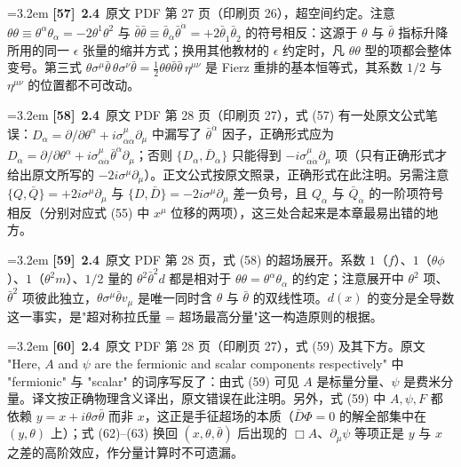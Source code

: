 \par
\par\medskip\noindent\hangindent=3.2em \textbf{[57]}~\textbf{2.4}~原文 PDF 第 27 页（印刷页 26），超空间约定。注意 $\theta\theta\equiv\theta^\alpha\theta_\alpha=-2\theta^1\theta^2$ 与 $\bar\theta\bar\theta\equiv\bar\theta_{\dot\alpha}\bar\theta^{\dot\alpha}=+2\bar\theta_{\dot1}\bar\theta_{\dot2}$ 的符号相反：这源于 $\theta$ 与 $\bar\theta$ 指标升降所用的同一 $\epsilon$ 张量的缩并方式；换用其他教材的 $\epsilon$ 约定时，凡 $\theta\theta$ 型的项都会整体变号。第三式 $\theta\sigma^\mu\bar\theta\,\theta\sigma^\nu\bar\theta=\frac12\theta\theta\bar\theta\bar\theta\,\eta^{\mu\nu}$ 是 Fierz 重排的基本恒等式，其系数 $1/2$ 与 $\eta^{\mu\nu}$ 的位置都不可改动。
\par
\par\medskip\noindent\hangindent=3.2em \textbf{[58]}~\textbf{2.4}~原文 PDF 第 28 页（印刷页 27），式 (57) 有一处原文公式笔误：$D_\alpha=\partial/\partial\theta^\alpha+i\sigma^\mu_{\alpha\dot\alpha}\partial_\mu$ 中漏写了 $\bar\theta^{\dot\alpha}$ 因子，正确形式应为 $D_\alpha=\partial/\partial\theta^\alpha+i\sigma^\mu_{\alpha\dot\alpha}\bar\theta^{\dot\alpha}\partial_\mu$；否则 $\{D_\alpha,\bar D_{\dot\alpha}\}$ 只能得到 $-i\sigma^\mu_{\alpha\dot\alpha}\partial_\mu$ 项（只有正确形式才给出原文所写的 $-2i\sigma^\mu\partial_\mu$）。正文公式按原文照录，正确形式在此注明。另需注意 $\{Q,\bar Q\}=+2i\sigma^\mu\partial_\mu$ 与 $\{D,\bar D\}=-2i\sigma^\mu\partial_\mu$ 差一负号，且 $Q_\alpha$ 与 $\bar Q_{\dot\alpha}$ 的一阶项符号相反（分别对应式 (55) 中 $x^\mu$ 位移的两项），这三处合起来是本章最易出错的地方。
\par
\par\medskip\noindent\hangindent=3.2em \textbf{[59]}~\textbf{2.4}~原文 PDF 第 28 页，式 (58) 的超场展开。系数 $1$（$f$）、$1$（$\theta\phi$）、$1$（$\theta^2m$）、$1/2$ 量的 $\theta^2\bar\theta^2d$ 都是相对于 $\theta\theta=\theta^\alpha\theta_\alpha$ 的约定；注意展开中 $\theta^2$ 项、$\bar\theta^2$ 项彼此独立，$\theta\sigma^\mu\bar\theta v_\mu$ 是唯一同时含 $\theta$ 与 $\bar\theta$ 的双线性项。$d(x)$ 的变分是全导数这一事实，是"超对称拉氏量 = 超场最高分量"这一构造原则的根据。
\par
\par\medskip\noindent\hangindent=3.2em \textbf{[60]}~\textbf{2.4}~原文 PDF 第 28 页（印刷页 27），式 (59) 及其下方。原文 "Here, $A$ and $\psi$ are the fermionic and scalar components respectively" 中 "fermionic" 与 "scalar" 的词序写反了：由式 (59) 可见 $A$ 是标量分量、$\psi$ 是费米分量。译文按正确物理含义译出，原文错误在此注明。另外，式 (59) 中 $A,\psi,F$ 都依赖 $y=x+i\theta\sigma\bar\theta$ 而非 $x$，这正是手征超场的本质（$\bar D\Phi=0$ 的解全部集中在 $(y,\theta)$ 上）；式 (62)--(63) 换回 $(x,\theta,\bar\theta)$ 后出现的 $\Box A$、$\partial_\mu\psi$ 等项正是 $y$ 与 $x$ 之差的高阶效应，作分量计算时不可遗漏。
